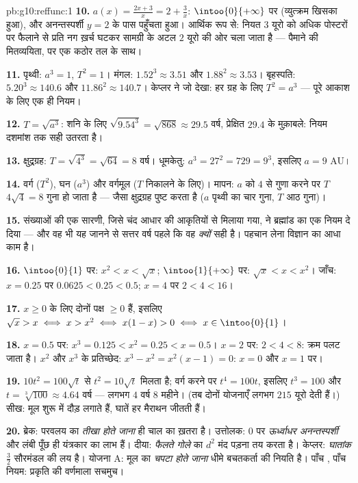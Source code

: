 \begin{solution}{pb:g10:reffunc:1}
\textbf{10.} $a(x) = \frac{2x + 3}{x} = 2 + \frac3x$: $\intoo{0}{+\infty}$ पर  (व्युत्क्रम  खिसका हुआ), और
अनन्तस्पर्शी $y = 2$ के पास पहुँचता हुआ। आर्थिक रूप से: नियत $3$ यूरो को
अधिक पोस्टरों पर फैलाने से प्रति नग ख़र्च घटकर सामग्री के अटल $2$ यूरो की
ओर चला जाता है --- पैमाने की मितव्ययिता, पर एक कठोर तल के साथ।

\textbf{11.} पृथ्वी: $a^3 = 1$, $T^2 = 1$। मंगल: $1.52^3 \approx 3.51$ और $1.88^2 \approx 3.53$। बृहस्पति: $5.20^3 \approx 140.6$
और $11.86^2 \approx 140.7$। केप्लर ने जो देखा: हर ग्रह के लिए $T^2 = a^3$ --- पूरे आकाश के लिए एक
ही नियम।

\textbf{12.} $T = \sqrt{a^3}$: शनि के लिए $\sqrt{9.54^3} = \sqrt{868} \approx 29.5$ वर्ष, प्रेक्षित $29.4$ के मुक़ाबले:
नियम दशमांश तक सही उतरता है।

\textbf{13.} क्षुद्रग्रह: $T = \sqrt{4^3} = \sqrt{64} = 8$ वर्ष। धूमकेतु: $a^3 = 27^2 = 729 = 9^3$, इसलिए $a = 9$ AU।

\textbf{14.} वर्ग ($T^2$), घन ($a^3$) और वर्गमूल ($T$ निकालने के लिए)।
मापन: $a$ को $4$ से गुणा करने पर $T$ $4\sqrt4 = 8$ गुना हो जाता है --- जैसा
क्षुद्रग्रह पुष्ट करता है ($a$ पृथ्वी का चार गुना, $T$ आठ गुना)।

\textbf{15.} संख्याओं की एक सारणी, जिसे चंद आधार  की आकृतियों से
मिलाया गया, ने ब्रह्मांड का एक नियम दे दिया --- और वह भी यह जानने से सत्तर
वर्ष पहले कि वह \emph{क्यों} सही है।  पहचान लेना विज्ञान का आधा काम है।

\textbf{16.} $\intoo{0}{1}$ पर: $x^2 < x < \sqrt x$; $\intoo{1}{+\infty}$ पर: $\sqrt x < x < x^2$। जाँच: $x = 0.25$ पर $0.0625 < 0.25 < 0.5$; $x = 4$
पर $2 < 4 < 16$।

\textbf{17.} $x \geq 0$ के लिए दोनों पक्ष $\geq 0$ हैं, इसलिए $\sqrt x > x \iff x > x^2 \iff x(1 - x) > 0 \iff
x \in \intoo{0}{1}$।

\textbf{18.} $x = 0.5$ पर: $x^3 = 0.125 < x^2 = 0.25 < x =
0.5$। $x = 2$ पर: $2 < 4 < 8$: क्रम पलट जाता है। $x^2$ और
$x^3$ के प्रतिच्छेद: $x^3 - x^2 = x^2(x - 1) = 0$: $x = 0$ और $x = 1$ पर।

\textbf{19.} $10t^2 = 100\sqrt t$ से $t^2 = 10\sqrt t$ मिलता है; वर्ग करने पर $t^4 = 100t$, इसलिए $t^3 = 100$ और
$t = \sqrt[3]{100} \approx 4.64$ वर्ष --- लगभग $4$ वर्ष $8$ महीने। (तब दोनों योजनाएँ लगभग $215$
यूरो देती हैं।) सीख: मूल शुरू में दौड़ लगाते हैं, घातें हर मैराथन जीतती
हैं।

\textbf{20.} ब्रेक: परवलय का \emph{तीखा होते जाना} ही चाल का ख़तरा है।
उत्तोलक: $0$ पर \emph{ऊर्ध्वाधर अनन्तस्पर्शी} और लंबी पूँछ ही यंत्रकार
का लाभ हैं। दीया: \emph{फैलते गोले} का $d^2$ मंद पड़ना तय करता है। केप्लर:
\emph{घातांक} $\frac32$ सौरमंडल की लय है। योजना A: मूल का \emph{चपटा होते
जाना} धीमे बचतकर्ता की नियति है। पाँच , पाँच नियम: प्रकृति की वर्णमाला
सचमुच।
\end{solution}
